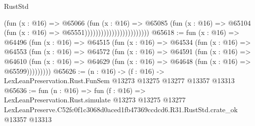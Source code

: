 \begin{lexlean}{RustStd}
\begin{coremodule}
                                            (fun (x : @16) =>
                                            @65066
                                              (fun (x : @16) =>
                                              @65085
                                                (fun (x : @16) =>
                                                @65104
                                                  (fun (x : @16) => @65551))))))))))))))))))))))))
@65618 := fun (x : @16) =>
  @64496
    (fun (x : @16) =>
    @64515
      (fun (x : @16) =>
      @64534
        (fun (x : @16) =>
        @64553
          (fun (x : @16) =>
          @64572
            (fun (x : @16) =>
            @64591
              (fun (x : @16) =>
              @64610
                (fun (x : @16) => @64629 (fun (x : @16) => @64648 (fun (x : @16) => @65599)))))))))
@65626 := (n : @16) ->
  (f : @16) -> LexLeanPreservation.Rust.FunSem @13273 @13275 @13277 @13357 @13313
@65636 := fun (n : @16) =>
  fun (f : @16) =>
  LexLeanPreservation.Rust.simulate
    @13273
    @13275
    @13277
    LexLeanPreserve.C52fc0f1c3068d0aced1fb47369ccdcd6.R31.RustStd.crate_ok
    @13357
    @13313
\end{coremodule}
\end{lexlean}
